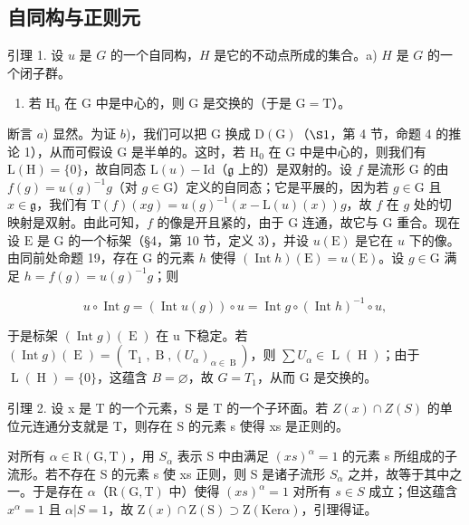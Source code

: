 \subsection{自同构与正则元}

引理 1. 设 \(u\) 是 \(G\) 的一个自同构，\(H\) 是它的不动点所成的集合。a) \(H\) 是 \(G\) 的一个闭子群。

\begin{enumerate}
\def\labelenumi{\alph{enumi})}
\setcounter{enumi}{1}
\tightlist
\item
  若 \(\mathrm{H}_0\) 在 G 中是中心的，则 G 是交换的（于是 \(\mathrm{G} = \mathrm{T}\)）。
\end{enumerate}

断言 \(a\)) 显然。为证 \(b\))，我们可以把 \(\mathrm{G}\) 换成 \(\mathrm{D}(\mathrm{G})\)（\(\S 1\)，第 4 节，命题 4 的推论 1），从而可假设 \(\mathrm{G}\) 是半单的。这时，若 \(\mathrm{H}_0\) 在 \(\mathrm{G}\) 中是中心的，则我们有 \(\mathrm{L}(\mathrm{H}) = \{0\}\)，故自同态 \(\mathrm{L}(u) - \mathrm{Id}\)（\(\mathfrak{g}\) 上的）是双射的。设 \(f\) 是流形 \(\mathrm{G}\) 的由 \(f(g) = u(g)^{-1}g\)（对 \(g \in \mathrm{G}\)）定义的自同态；它是平展的，因为若 \(g \in \mathrm{G}\) 且 \(x \in \mathfrak{g}\)，我们有 \(\mathrm{T}(f)(xg) = u(g)^{-1}(x - \mathrm{L}(u)(x))g\)，故 \(f\) 在 \(g\) 处的切映射是双射。由此可知，\(f\) 的像是开且紧的，由于 \(\mathrm{G}\) 连通，故它与 \(\mathrm{G}\) 重合。现在设 \(\mathrm{E}\) 是 G 的一个标架（§4，第 10 节，定义 3），并设 \(u(\mathrm{E})\) 是它在 \(u\) 下的像。由同前处命题 19，存在 G 的元素 \(h\) 使得 \((\operatorname{Int} h)(\mathrm{E}) = u(\mathrm{E})\)。设 \(g \in \mathrm{G}\) 满足 \(h = f(g) = u(g)^{-1}g\)；则

\[
u \circ \operatorname{Int} g = (\operatorname{Int} u (g)) \circ u = \operatorname{Int} g \circ (\operatorname{Int} h) ^ {- 1} \circ u,
\]

于是标架 \((\operatorname{Int} g)(\operatorname{E})\) 在 u 下稳定。若 \((\operatorname{Int} g)(\operatorname{E}) = (\operatorname{T}_{1}, \operatorname{B}, (U_{\alpha})_{\alpha \in \operatorname{B}})\)，则 \(\sum U_{\alpha} \in \operatorname{L}(\operatorname{H})\)；由于 \(\operatorname{L}(\operatorname{H}) = \{0\}\)，这蕴含 \(B = \varnothing\)，故 \(G = T_{1}\)，从而 G 是交换的。

引理 2. 设 x 是 T 的一个元素，S 是 T 的一个子环面。若 \(Z(x) \cap Z(S)\) 的单位元连通分支就是 T，则存在 S 的元素 s 使得 xs 是正则的。

对所有 \(\alpha\in\mathrm{R}(\mathrm{G},\mathrm{T})\)，用 \(S_{\alpha}\) 表示 S 中由满足 \((xs)^{\alpha}=1\) 的元素 s 所组成的子流形。若不存在 S 的元素 s 使 xs 正则，则 S 是诸子流形 \(S_{\alpha}\) 之并，故等于其中之一。于是存在 \(\alpha\)（\(\mathrm{R}(\mathrm{G},\mathrm{T})\) 中）使得 \((xs)^{\alpha}=1\) 对所有 \(s\in S\) 成立；但这蕴含 \(x^{\alpha}=1\) 且 \(\alpha|S=1\)，故 \(\mathrm{Z}(x)\cap\mathrm{Z}(\mathrm{S})\supset\mathrm{Z}(\mathrm{Ker}\alpha)\)，引理得证。

